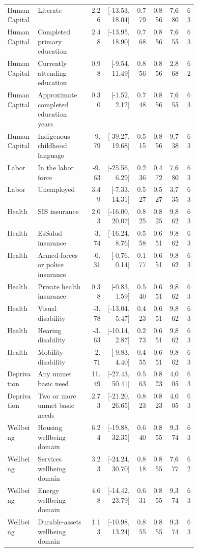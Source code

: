 \begin{longtable}{p{0.16\linewidth}p{0.29\linewidth}rrrrrr}
Human Capital & Literate & 2.26 & [-13.53, 18.04] & 0.779 & 0.856 & 7,680 & 63 \\
Human Capital & Completed primary education & 2.48 & [-13.95, 18.90] & 0.768 & 0.856 & 7,655 & 63 \\
Human Capital & Currently attending education & 0.98 & [-9.54, 11.49] & 0.856 & 0.856 & 2,868 & 62 \\
Human Capital & Approximate completed education years & 0.30 & [-1.52, 2.12] & 0.748 & 0.856 & 7,655 & 63 \\
Human Capital & Indigenous childhood language & -9.79 & [-39.27, 19.68] & 0.515 & 0.856 & 9,738 & 63 \\
Labor & In the labor force & -9.63 & [-25.56, 6.29] & 0.236 & 0.472 & 7,680 & 63 \\
Labor & Unemployed & 3.49 & [-7.33, 14.31] & 0.527 & 0.527 & 3,735 & 63 \\
Health & SIS insurance & 2.03 & [-16.00, 20.07] & 0.825 & 0.825 & 9,862 & 63 \\
Health & EsSalud insurance & -3.74 & [-16.24, 8.76] & 0.558 & 0.651 & 9,862 & 63 \\
Health & Armed-forces or police insurance & -0.31 & [-0.76, 0.14] & 0.177 & 0.651 & 9,862 & 63 \\
Health & Private health insurance & 0.38 & [-0.83, 1.59] & 0.540 & 0.651 & 9,862 & 63 \\
Health & Visual disability & -3.78 & [-13.04, 5.47] & 0.423 & 0.651 & 9,862 & 63 \\
Health & Hearing disability & -3.63 & [-10.14, 2.87] & 0.273 & 0.651 & 9,862 & 63 \\
Health & Mobility disability & -2.71 & [-9.83, 4.40] & 0.455 & 0.651 & 9,862 & 63 \\
Deprivation & Any unmet basic need & 11.49 & [-27.43, 50.41] & 0.563 & 0.823 & 4,005 & 63 \\
Deprivation & Two or more unmet basic needs & 2.73 & [-21.20, 26.65] & 0.823 & 0.823 & 4,005 & 63 \\
Wellbeing & Housing wellbeing domain & 6.24 & [-19.88, 32.35] & 0.640 & 0.855 & 9,374 & 63 \\
Wellbeing & Services wellbeing domain & 3.23 & [-24.24, 30.70] & 0.818 & 0.855 & 7,677 & 62 \\
Wellbeing & Energy wellbeing domain & 4.68 & [-14.42, 23.79] & 0.631 & 0.855 & 9,374 & 63 \\
Wellbeing & Durable-assets wellbeing domain & 1.13 & [-10.98, 13.24] & 0.855 & 0.855 & 9,374 & 63 \\

\end{longtable}
